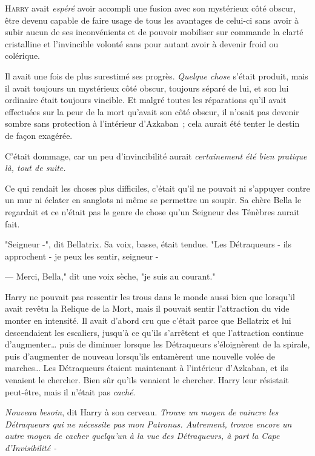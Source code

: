 
\lettrine{H}{arry} avait \emph{espéré} avoir accompli une fusion avec son mystérieux côté obscur, être devenu capable de faire usage de tous les avantages de celui-ci sans avoir à subir aucun de ses inconvénients et de pouvoir mobiliser sur commande la clarté cristalline et l'invincible volonté sans pour autant avoir à devenir froid ou colérique.

Il avait une fois de plus surestimé ses progrès. \emph{Quelque chose} s'était produit, mais il avait toujours un mystérieux côté obscur, toujours séparé de lui, et son lui ordinaire était toujours vincible. Et malgré toutes les réparations qu'il avait effectuées sur la peur de la mort qu'avait son côté obscur, il n'osait pas devenir sombre sans protection à l'intérieur d'Azkaban~; cela aurait été tenter le destin de façon exagérée.

C'était dommage, car un peu d'invincibilité aurait \emph{certainement été bien pratique là, tout de suite.}

Ce qui rendait les choses plus difficiles, c'était qu'il ne pouvait ni s'appuyer contre un mur ni éclater en sanglots ni même se permettre un soupir. Sa chère Bella le regardait et ce n'était pas le genre de chose qu'un Seigneur des Ténèbres aurait fait.

"Seigneur -", dit Bellatrix. Sa voix, basse, était tendue. "Les Détraqueurs - ils approchent - je peux les sentir, seigneur -

--- Merci, Bella," dit une voix sèche, "je suis au courant."

Harry ne pouvait pas ressentir les trous dans le monde aussi bien que lorsqu'il avait revêtu la Relique de la Mort, mais il pouvait sentir l'attraction du vide monter en intensité. Il avait d'abord cru que c'était parce que Bellatrix et lui descendaient les escaliers, jusqu'à ce qu'ils s'arrêtent et que l'attraction continue d'augmenter… puis de diminuer lorsque les Détraqueurs s'éloignèrent de la spirale, puis d'augmenter de nouveau lorsqu'ils entamèrent une nouvelle volée de marches… Les Détraqueurs étaient maintenant à l'intérieur d'Azkaban, et ils venaient le chercher. Bien sûr qu'ils venaient le chercher. Harry leur résistait peut-être, mais il n'était pas \emph{caché}.

\emph{Nouveau besoin}, dit Harry à son cerveau. \emph{Trouve un moyen de vaincre les Détraqueurs qui ne nécessite pas mon Patronus. Autrement, trouve encore un autre moyen de cacher quelqu'un à la vue des Détraqueurs, à part la Cape d'Invisibilité -}

